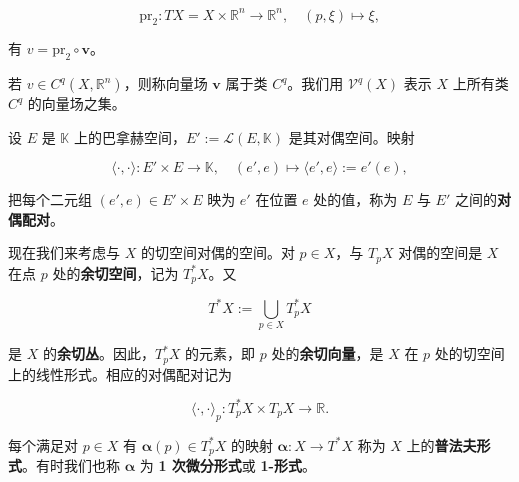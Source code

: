 \[
\mathrm{pr}_{2} : TX = X \times \mathbb{R}^{n} \to \mathbb{R}^{n} , \quad (p,\xi) \mapsto \xi ,
\]

有 $ v = \mathrm{pr}_{2} \circ \boldsymbol{v} $。

若 $ v \in C^{q}(X,\mathbb{R}^{n}) $，则称向量场 $ \boldsymbol{v} $ 属于类 $ C^{q} $。我们用 $ \mathcal{V}^{q}(X) $ 表示 $ X $ 上所有类 $ C^{q} $ 的向量场之集。

设 $ E $ 是 $ \mathbb{K} $ 上的巴拿赫空间，$ E' := \mathcal{L}(E,\mathbb{K}) $ 是其对偶空间。映射

\[
\langle\cdot,\cdot\rangle : E' \times E \to \mathbb{K} , \quad (e',e) \mapsto \langle e',e\rangle := e'(e) ,
\]

把每个二元组 $ (e',e) \in E' \times E $ 映为 $ e' $ 在位置 $ e $ 处的值，称为 $ E $ 与 $ E' $ 之间的\textbf{对偶配对}。

现在我们来考虑与 $ X $ 的切空间对偶的空间。对 $ p \in X $，与 $ T_{p}X $ 对偶的空间是 $ X $ 在点 $ p $ 处的\textbf{余切空间}，记为 $ T_{p}^{*}X $。又

\[
T^{*}X := \bigcup_{p \in X}T_{p}^{*}X
\]

是 $ X $ 的\textbf{余切丛}。因此，$ T_{p}^{*}X $ 的元素，即 $ p $ 处的\textbf{余切向量}，是 $ X $ 在 $ p $ 处的切空间上的线性形式。相应的对偶配对记为

\[
\langle\cdot,\cdot\rangle_{p} : T_{p}^{*}X \times T_{p}X \to \mathbb{R} .
\]

每个满足对 $ p \in X $ 有 $ \boldsymbol{\alpha}(p) \in T_{p}^{*}X $ 的映射 $ \boldsymbol{\alpha} : X \to T^{*}X $ 称为 $ X $ 上的\textbf{普法夫形式}。有时我们也称 $ \boldsymbol{\alpha} $ 为\textbf{ 1 次微分形式}或 \textbf{1-形式}。


